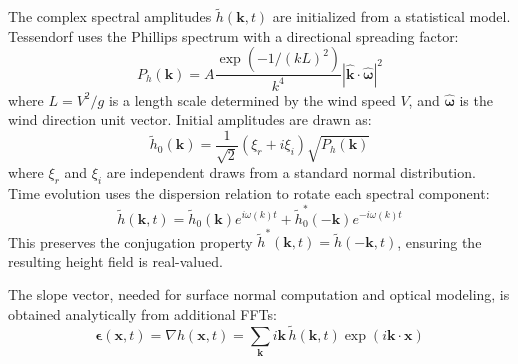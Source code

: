     The complex spectral amplitudes $\tilde{h}(\mathbf{k}, t)$ are initialized from a statistical model. Tessendorf uses the Phillips spectrum \cite{Phillips1958} with a directional spreading factor:
    \begin{equation}
        P_h(\mathbf{k}) = A \frac{\exp(-1/(kL)^2)}{k^4} \left|\hat{\mathbf{k}} \cdot \hat{\boldsymbol{\omega}}\right|^2
        \label{eq:phillips_directional}
    \end{equation}
    where $L = V^2/g$ is a length scale determined by the wind speed $V$, and $\hat{\boldsymbol{\omega}}$ is the wind direction unit vector. Initial amplitudes are drawn as:
    \begin{equation}
        \tilde{h}_0(\mathbf{k}) = \frac{1}{\sqrt{2}} (\xi_r + i\xi_i) \sqrt{P_h(\mathbf{k})}
        \label{eq:initial_amplitudes}
    \end{equation}
    where $\xi_r$ and $\xi_i$ are independent draws from a standard normal distribution. Time evolution uses the dispersion relation to rotate each spectral component:
    \begin{equation}
        \tilde{h}(\mathbf{k}, t) = \tilde{h}_0(\mathbf{k}) e^{i\omega(k)t} + \tilde{h}_0^*(-\mathbf{k}) e^{-i\omega(k)t}
        \label{eq:time_evolution}
    \end{equation}
    This preserves the conjugation property $\tilde{h}^*(\mathbf{k}, t) = \tilde{h}(-\mathbf{k}, t)$, ensuring the resulting height field is real-valued.

    The slope vector, needed for surface normal computation and optical modeling, is obtained analytically from additional FFTs:
    \begin{equation}
        \boldsymbol{\epsilon}(\mathbf{x}, t) = \nabla h(\mathbf{x}, t) = \sum_{\mathbf{k}} i\mathbf{k}\, \tilde{h}(\mathbf{k}, t) \exp(i\mathbf{k} \cdot \mathbf{x})
        \label{eq:slope}
    \end{equation}

